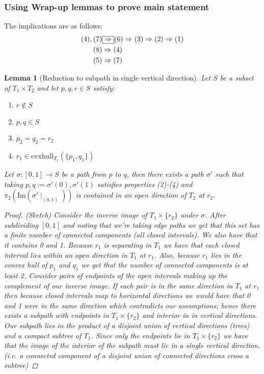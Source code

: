 \documentclass{article}
\theoremstyle{mystyle}
\newtheorem{lem}{Lemma}[section]
\theoremstyle{remark}
\begin{document}
\subsubsection{Using Wrap-up lemmas to prove main statement}
The implications are as follows:
\begin{alignat}{3}
    (4),(7) &\fbox{\(\label{eqn:filling}\Rightarrow\)}  (6) \Rightarrow (3) \Rightarrow (2)\Rightarrow (1) \\
    (8) &\Rightarrow (4)\\
    (5) &\Rightarrow (7)
\end{alignat}
\begin{lem}
    [Reduction to subpath in single vertical direction]
    \label{lem:verticalsubpath} 
    Let \(S\) be a subset of \(T_{1} \times T_{2}\) and let \(p,q,r \in S\) satisfy: 
    \begin{enumerate}
        \item \(r \not\in S\) 
        \item \(p,q \in S\) 
        \item \(p_{2} = q_{2} = r_{2}\) 
        \item \(r_{1} \in \text{cvxhull}_{T_{1}} (\{p_{1}, q_{1} \} )\) 
    \end{enumerate}
    Let \(\sigma : [0,1] \to S\) be a path from \(p\) to \(q\), then there exists a path \(\sigma '\) such that taking \(p,q:= \sigma '(0), \sigma '(1)\) satisfies properties (2)-(4) and \(\pi_{2} (\text{Im}( \sigma '\mid_{(0,1)} ))\) is contained in an open direction of \(T_{2}\) at \(r_{2}\).
    \begin{proof}
        (Sketch) Consider the inverse image of \(T_{1} \times \{r_{2}\} \) under \(\sigma\). After subdividing \([0,1]\) and noting that we're taking edge paths we get that this set has a finite number of connected components (all closed intervals). We also have that it contains 0 and 1. Because \(r_{1}\) is separating in \(T_{1}\) we have that each closed interval lies within an open direction in \(T_{1}\) at \(r_{1}\). Also, because \(r_{1}\) lies in the convex hull of \(p_{1}\) and \(q_{1}\) we get that the number of connected components is at least 2. Consider pairs of endpoints of the open intervals making up the complement of our inverse image. If each pair is in the same direction in \(T_{1}\) at \(r_{1}\) then because closed intervals map to horizontal directions we would have that 0 and 1 were in the same direction which contradicts our assumptions; hence there exists a subpath with endpoints in \(T_{1} \times \{r_{2}\}\) and interior in in vertical directions. Our subpath lies in the product of a disjoint union of vertical directions (trees) and a compact subtree of \(T_{1}\). Since only the endpoints lie in \(T_{1} \times \{r_{2}\}\) we have that the image of the interior of the subpath must lie in a single vertical direction. (i.e. a connected component of a disjoint union of connected directions cross a subtree)

    \end{proof}
\end{lem}
\end{document}
